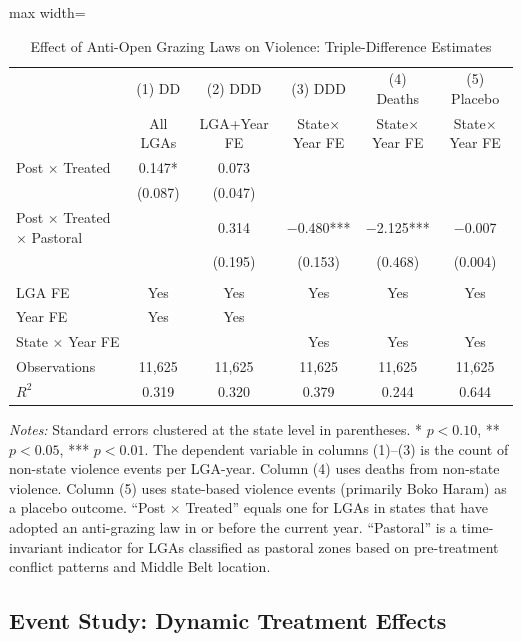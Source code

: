 \documentclass[12pt]{article}
\begin{document}
\begin{table}[H]
\centering
\caption{Effect of Anti-Open Grazing Laws on Violence: Triple-Difference Estimates}
\label{tab:main}
\begin{adjustbox}{max width=\textwidth}
\begin{threeparttable}
\begin{tabular}{lccccc}
\toprule
& (1) DD & (2) DDD & (3) DDD & (4) Deaths & (5) Placebo \\
& All LGAs & LGA+Year FE & State$\times$Year FE & State$\times$Year FE & State$\times$Year FE \\
\midrule
Post $\times$ Treated & 0.147* & 0.073 & & & \\
& (0.087) & (0.047) & & & \\
Post $\times$ Treated $\times$ Pastoral & & 0.314 & $-$0.480*** & $-$2.125*** & $-$0.007 \\
& & (0.195) & (0.153) & (0.468) & (0.004) \\
\\
LGA FE & Yes & Yes & Yes & Yes & Yes \\
Year FE & Yes & Yes & & & \\
State $\times$ Year FE & & & Yes & Yes & Yes \\
Observations & 11,625 & 11,625 & 11,625 & 11,625 & 11,625 \\
$R^2$ & 0.319 & 0.320 & 0.379 & 0.244 & 0.644 \\
\bottomrule
\end{tabular}
\begin{tablenotes}[flushleft]
\small
\item \textit{Notes:} Standard errors clustered at the state level in parentheses. * $p<0.10$, ** $p<0.05$, *** $p<0.01$. The dependent variable in columns (1)--(3) is the count of non-state violence events per LGA-year. Column (4) uses deaths from non-state violence. Column (5) uses state-based violence events (primarily Boko Haram) as a placebo outcome. ``Post $\times$ Treated'' equals one for LGAs in states that have adopted an anti-grazing law in or before the current year. ``Pastoral'' is a time-invariant indicator for LGAs classified as pastoral zones based on pre-treatment conflict patterns and Middle Belt location.
\end{tablenotes}
\end{threeparttable}
\end{adjustbox}
\end{table}

\subsection{Event Study: Dynamic Treatment Effects}
\end{document}
